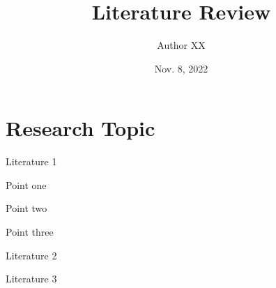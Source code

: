 \documentclass[11pt]{article}
\title{Literature Review}
\author{Author XX}
\date{Nov. 8, 2022}
\begin{document}
\maketitle



\section*{Research Topic}

\begin{biblist}
  \item Literature 1
  \begin{biblist}
    \item Point one
    \item Point two
    \item Point three
  \end{biblist}
  \item Literature 2
  \item Literature 3
\end{biblist}
\end{document}
